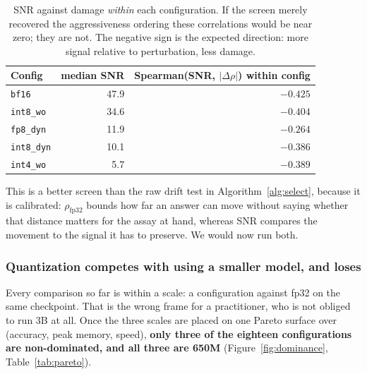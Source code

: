 \documentclass[11pt]{article}
\newcommand{\cfg}[1]{\texttt{#1}}
\begin{document}
\begin{table}[htb]
\centering
\caption{SNR against damage \emph{within} each configuration. If the screen
merely recovered the aggressiveness ordering these correlations would be near
zero; they are not. The negative sign is the expected direction: more signal
relative to perturbation, less damage.}
\label{tab:snrwithin}
\small
\begin{tabular}{lrr}
\toprule
Config & median SNR & Spearman(SNR, $|\Delta\rho|$) within config \\
\midrule
\cfg{bf16}      & 47.9 & $-0.425$ \\
\cfg{int8\_wo}  & 34.6 & $-0.404$ \\
\cfg{fp8\_dyn}  & 11.9 & $-0.264$ \\
\cfg{int8\_dyn} & 10.1 & $-0.386$ \\
\cfg{int4\_wo}  &  5.7 & $-0.389$ \\
\bottomrule
\end{tabular}
\end{table}

This is a better screen than the raw drift test in Algorithm~\ref{alg:select},
because it is calibrated: $\rho_{\text{fp32}}$ bounds how far an answer can move
without saying whether that distance matters for the assay at hand, whereas SNR
compares the movement to the signal it has to preserve. We would now run both.

\subsubsection{Quantization competes with using a smaller model, and loses}

Every comparison so far is within a scale: a configuration against fp32 on the
same checkpoint. That is the wrong frame for a practitioner, who is not obliged
to run 3B at all. Once the three scales are placed on one Pareto surface over
(accuracy, peak memory, speed), \textbf{only three of the eighteen
configurations are non-dominated, and all three are 650M}
(Figure~\ref{fig:dominance}, Table~\ref{tab:pareto}).
\end{document}
